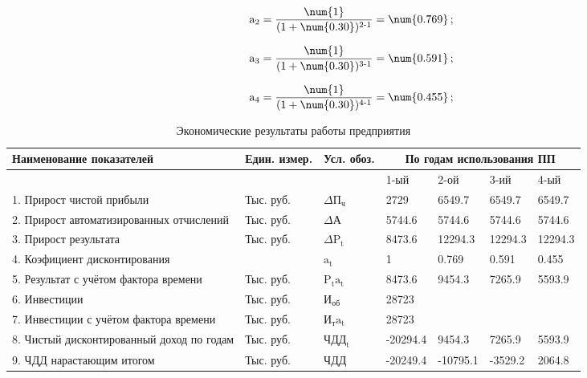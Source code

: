 \begin{equation}    
    \text{a}_\text{2} =\frac{\num{1}}{(1+\num{0.30})^\text{2-1}} = \num{0.769} \text{\,;}
\end{equation}
    
\begin{equation}     
    \text{a}_\text{3} =\frac{\num{1}}{(1+\num{0.30})^\text{3-1}} = \num{0.591} \text{\,;}
\end{equation}
    
\begin{equation}      
    \text{a}_\text{4} =\frac{\num{1}}{(1+\num{0.30})^\text{4-1}} = \num{0.455} \text{\,;}
\end{equation}
    
\begin{table}[h]
\caption{Экономические результаты работы предприятия}
\begin{tabular}{|p{35mm}|p{10mm}|p{10mm}|p{20mm}|p{20mm}|p{20mm}|p{20mm}|}
\hline
Наименование показателей & Един. измер. & Усл. обоз. & \multicolumn{4}{c|}{По годам использования ПП}     \\ \hline
\multicolumn{1}{|c|}{} & & & 1-ый & 2-ой & 3-ий & 4-ый \\ \hline
1. Прирост чистой прибыли & Тыс. руб. & $\Delta \text{П}_\text{ч} $ & 2729 & 6549.7 & 6549.7 & 6549.7 \\ \hline
2. Прирост автоматизированных отчислений & Тыс. руб. &  $\Delta \text{А} $ & 5744.6 & 5744.6 & 5744.6 & 5744.6   \\ \hline
3. Прирост результата & Тыс. руб. & $ \Delta \text{P}_\text{t} $ & 8473.6 & 12294.3 & 12294.3 & 12294.3 \\ \hline
4. Коэфициент дисконтирования & & $\text{a}_\text{t} $ & 1 & 0.769 & 0.591 & 0.455 \\ \hline
5. Результат с учётом фактора времени & Тыс. руб. & $\text{P}_\text{t}\text{a}_\text{t} $ & 8473.6 & 9454.3 & 7265.9 & 5593.9 \\ \hline
6. Инвестиции & Тыс. руб. &  $ \text{И}_\text{об} $ & 28723 & & & \\ \hline
7. Инвестиции с  учётом фактора времени & Тыс. руб. & $ \text{И}_\text{т}\text{a}_\text{t} $ & 28723 & & & \\ \hline
8. Чистый дисконтированный доход по годам & Тыс. руб. & $\text{ЧДД}_\text{t}$ & -20294.4 & 9454.3 & 7265.9 & 5593.9 \\ \hline
9. ЧДД нарастающим итогом & Тыс. руб. & $\text{ЧДД} $ & -20249.4 & -10795.1 & -3529.2
 & 2064.8 \\ \hline
\end{tabular}
\end{table}

